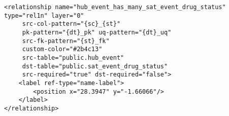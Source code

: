 \begin{lstlisting}
<relationship name="hub_event_has_many_sat_event_drug_status" type="rel1n" layer="0"
	 src-col-pattern="{sc}_{st}"
	 pk-pattern="{dt}_pk" uq-pattern="{dt}_uq"
	 src-fk-pattern="{st}_fk"
	 custom-color="#2b4c13"
	 src-table="public.hub_event"
	 dst-table="public.sat_event_drug_status"
	 src-required="true" dst-required="false">
	<label ref-type="name-label">
		<position x="28.3947" y="-1.66066"/>
	</label>
</relationship>

\end{lstlisting}